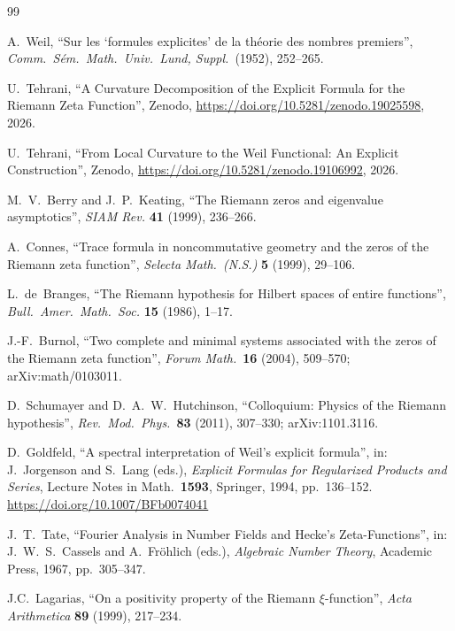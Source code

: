 \documentclass[11pt]{article}
\begin{document}
\newpage
\begin{thebibliography}{99}

A.~Weil,
``Sur les `formules explicites' de la th\'eorie des nombres premiers'',
\emph{Comm.\ S\'em.\ Math.\ Univ.\ Lund, Suppl.}\ (1952), 252--265.

U.~Tehrani,
``A Curvature Decomposition of the Explicit Formula
  for the Riemann Zeta Function'',
Zenodo, \url{https://doi.org/10.5281/zenodo.19025598}, 2026.

U.~Tehrani,
``From Local Curvature to the Weil Functional:
  An Explicit Construction'',
Zenodo, \url{https://doi.org/10.5281/zenodo.19106992}, 2026.

M.~V.~Berry and J.~P.~Keating,
``The Riemann zeros and eigenvalue asymptotics'',
\emph{SIAM Rev.} \textbf{41} (1999), 236--266.

A.~Connes,
``Trace formula in noncommutative geometry and the zeros of the Riemann
zeta function'',
\emph{Selecta Math.\ (N.S.)} \textbf{5} (1999), 29--106.

L.~de~Branges,
``The Riemann hypothesis for Hilbert spaces of entire functions'',
\emph{Bull.\ Amer.\ Math.\ Soc.} \textbf{15} (1986), 1--17.

J.-F.~Burnol,
``Two complete and minimal systems associated with the zeros of the
Riemann zeta function'',
\textit{Forum Math.}\ \textbf{16} (2004), 509--570;
arXiv:math/0103011.

D.~Schumayer and D.~A.~W.~Hutchinson,
``Colloquium: Physics of the Riemann hypothesis'',
\textit{Rev.\ Mod.\ Phys.}\ \textbf{83} (2011), 307--330;
arXiv:1101.3116.

D.~Goldfeld,
``A spectral interpretation of Weil's explicit formula'',
in: J.~Jorgenson and S.~Lang (eds.),
\emph{Explicit Formulas for Regularized Products and Series},
Lecture Notes in Math.\ \textbf{1593}, Springer, 1994, pp.~136--152.
\url{https://doi.org/10.1007/BFb0074041}

J.~T.~Tate,
``Fourier Analysis in Number Fields and Hecke's Zeta-Functions'',
in: J.~W.~S.~Cassels and A.~Fr\"ohlich (eds.),
\emph{Algebraic Number Theory},
Academic Press, 1967, pp.~305--347.

J.C.~Lagarias,
``On a positivity property of the Riemann $\xi$-function'',
\emph{Acta Arithmetica} \textbf{89} (1999), 217--234.


\end{thebibliography}
\end{document}
